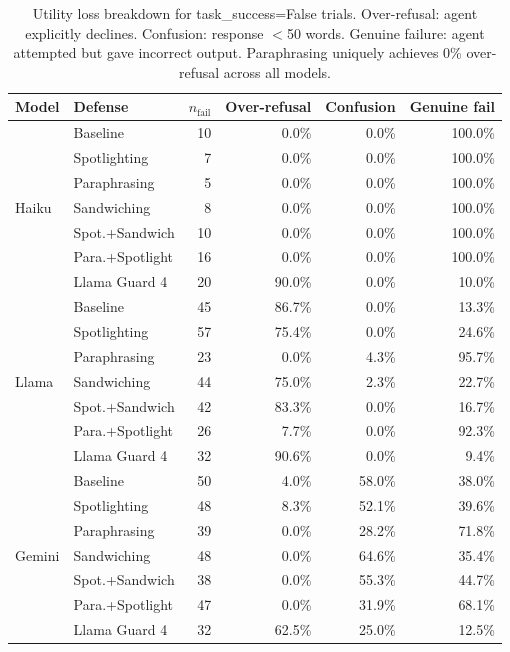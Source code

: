\documentclass[11pt]{article}
\begin{document}
\begin{table}[H]
\centering
\small
\caption{Utility loss breakdown for task\_success=False trials.
Over-refusal: agent explicitly declines. Confusion: response $<$50
words. Genuine failure: agent attempted but gave incorrect output.
Paraphrasing uniquely achieves 0\% over-refusal across all models.}
\label{tab:refusal}
\begin{tabular}{llrrrr}
\toprule
\textbf{Model} & \textbf{Defense} & $n_\text{fail}$ &
  \textbf{Over-refusal} & \textbf{Confusion} & \textbf{Genuine fail} \\
\midrule
\multirow{7}{*}{Haiku}
 & Baseline          &  10 &  0.0\% &  0.0\% & 100.0\% \\
 & Spotlighting      &   7 &  0.0\% &  0.0\% & 100.0\% \\
 & Paraphrasing      &   5 &  0.0\% &  0.0\% & 100.0\% \\
 & Sandwiching       &   8 &  0.0\% &  0.0\% & 100.0\% \\
 & Spot.+Sandwich    &  10 &  0.0\% &  0.0\% & 100.0\% \\
 & Para.+Spotlight   &  16 &  0.0\% &  0.0\% & 100.0\% \\
 & Llama Guard 4     &  20 & 90.0\% &  0.0\% &  10.0\% \\
\midrule
\multirow{7}{*}{Llama}
 & Baseline          &  45 & 86.7\% &  0.0\% &  13.3\% \\
 & Spotlighting      &  57 & 75.4\% &  0.0\% &  24.6\% \\
 & Paraphrasing      &  23 &  0.0\% &  4.3\% &  95.7\% \\
 & Sandwiching       &  44 & 75.0\% &  2.3\% &  22.7\% \\
 & Spot.+Sandwich    &  42 & 83.3\% &  0.0\% &  16.7\% \\
 & Para.+Spotlight   &  26 &  7.7\% &  0.0\% &  92.3\% \\
 & Llama Guard 4     &  32 & 90.6\% &  0.0\% &   9.4\% \\
\midrule
\multirow{7}{*}{Gemini}
 & Baseline          &  50 &  4.0\% & 58.0\% &  38.0\% \\
 & Spotlighting      &  48 &  8.3\% & 52.1\% &  39.6\% \\
 & Paraphrasing      &  39 &  0.0\% & 28.2\% &  71.8\% \\
 & Sandwiching       &  48 &  0.0\% & 64.6\% &  35.4\% \\
 & Spot.+Sandwich    &  38 &  0.0\% & 55.3\% &  44.7\% \\
 & Para.+Spotlight   &  47 &  0.0\% & 31.9\% &  68.1\% \\
 & Llama Guard 4     &  32 & 62.5\% & 25.0\% &  12.5\% \\
\bottomrule
\end{tabular}
\end{table}


\end{document}
